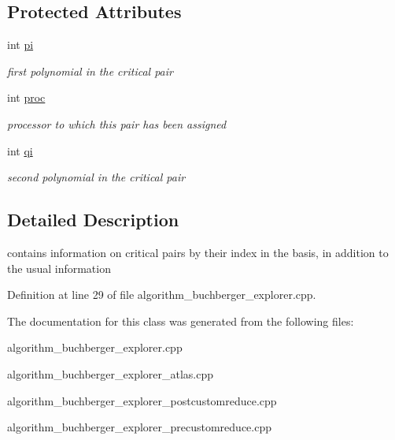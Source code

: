 \subsection*{Protected Attributes}
\begin{DoxyCompactItemize}
\item 
\mbox{\label{class_critical___pair___x_plor_a815645cd7956540b6980868654e149a3}} 
int \hyperlink{class_critical___pair___x_plor_a815645cd7956540b6980868654e149a3}{pi}
\begin{DoxyCompactList}\small\item\em first polynomial in the critical pair \end{DoxyCompactList}\item 
\mbox{\label{class_critical___pair___x_plor_a4e0a3c515ad3d9e29cec832d95ab2caa}} 
int \hyperlink{class_critical___pair___x_plor_a4e0a3c515ad3d9e29cec832d95ab2caa}{proc}
\begin{DoxyCompactList}\small\item\em processor to which this pair has been assigned \end{DoxyCompactList}\item 
\mbox{\label{class_critical___pair___x_plor_a14a644d6decf4147a78dbaa85612130a}} 
int \hyperlink{class_critical___pair___x_plor_a14a644d6decf4147a78dbaa85612130a}{qi}
\begin{DoxyCompactList}\small\item\em second polynomial in the critical pair \end{DoxyCompactList}\end{DoxyCompactItemize}


\subsection{Detailed Description}
contains information on critical pairs by their index in the basis, in addition to the usual information 

Definition at line 29 of file algorithm\+\_\+buchberger\+\_\+explorer.\+cpp.



The documentation for this class was generated from the following files\+:\begin{DoxyCompactItemize}
\item 
algorithm\+\_\+buchberger\+\_\+explorer.\+cpp\item 
algorithm\+\_\+buchberger\+\_\+explorer\+\_\+atlas.\+cpp\item 
algorithm\+\_\+buchberger\+\_\+explorer\+\_\+postcustomreduce.\+cpp\item 
algorithm\+\_\+buchberger\+\_\+explorer\+\_\+precustomreduce.\+cpp\end{DoxyCompactItemize}
